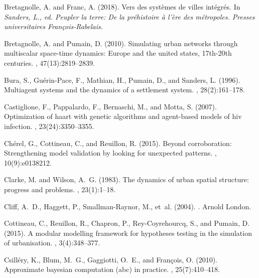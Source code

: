 \documentclass[10pt]{article}
\begin{document}
\begin{thebibliography}{}
Bretagnolle, A. and Franc, A. (2018).
\newblock Vers des syst{\`e}mes de villes int{\'e}gr{\'e}s.
\newblock In {\em Sanders, L., ed. Peupler la terre: De la pr{\'e}histoire à
  l'{\`e}re des m{\'e}tropoles. Presses universitaires François-Rabelais.}

Bretagnolle, A. and Pumain, D. (2010).
\newblock Simulating urban networks through multiscalar space-time dynamics:
  Europe and the united states, 17th-20th centuries.
, 47(13):2819--2839.

Bura, S., Gu{\'e}rin-Pace, F., Mathian, H., Pumain, D., and Sanders, L. (1996).
\newblock Multiagent systems and the dynamics of a settlement system.
, 28(2):161--178.

Castiglione, F., Pappalardo, F., Bernaschi, M., and Motta, S. (2007).
\newblock Optimization of haart with genetic algorithms and agent-based models
  of hiv infection.
, 23(24):3350--3355.

Ch{\'e}rel, G., Cottineau, C., and Reuillon, R. (2015).
\newblock Beyond corroboration: Strengthening model validation by looking for
  unexpected patterns.
, 10(9):e0138212.

Clarke, M. and Wilson, A.~G. (1983).
\newblock The dynamics of urban spatial structure: progress and problems.
, 23(1):1--18.

Cliff, A.~D., Haggett, P., Smallman-Raynor, M., et~al. (2004).
.
\newblock Arnold London.

Cottineau, C., Reuillon, R., Chapron, P., Rey-Coyrehourcq, S., and Pumain, D.
  (2015).
\newblock A modular modelling framework for hypotheses testing in the
  simulation of urbanisation.
, 3(4):348--377.

Csill{\'e}ry, K., Blum, M.~G., Gaggiotti, O.~E., and Fran{\c{c}}ois, O. (2010).
\newblock Approximate bayesian computation (abc) in practice.
, 25(7):410--418.


\end{thebibliography}
\end{document}

